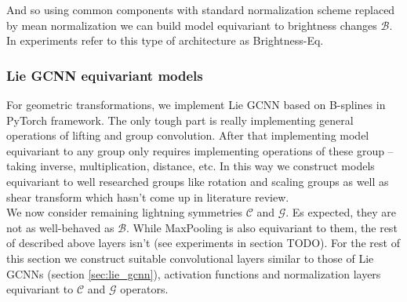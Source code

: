 And so using common components with standard normalization scheme replaced by
mean normalization we can build model equivariant to brightness changes
$\mathcal{B}$. In
experiments refer to this type of architecture as Brightness-Eq.

\subsubsection{Lie GCNN equivariant models}
For geometric transformations, we implement Lie GCNN
based on B-splines \cite{bekkers2019} in PyTorch framework.
The only tough part is really
implementing general operations of lifting and group convolution.
After that implementing model equivariant to any group only requires implementing operations
of these group -- taking inverse, multiplication, distance, etc.
In this way we construct models equivariant to well researched groups like
rotation and
scaling groups as well as shear transform which hasn't come up in literature
review.
\\

We now consider remaining lightning symmetries $\mathcal{C}$ and $\mathcal{G}$.
Es expected, they are not
as well-behaved as $\mathcal{B}$. While MaxPooling is also equivariant to them,
the rest
of described above layers isn't (see experiments in section TODO).
For the rest of this section we construct suitable
convolutional layers similar to those of Lie
GCNNs (section \ref{sec:lie_gcnn}),
activation functions and
normalization layers
equivariant to $\mathcal{C}$ and $\mathcal{G}$ operators.

